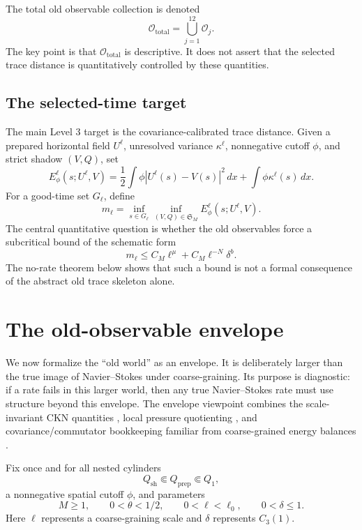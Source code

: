 \documentclass[11pt]{article}
\numberwithin{equation}{section}
\newcommand{\dx}{\,dx}
\newcommand{\calO}{\mathcal O}
\newcommand{\frakS}{\mathfrak S}
\begin{document}
The total old observable collection is denoted
\[
\calO_{\mathrm{total}}=\bigcup_{j=1}^{12}\calO_j.
\]
The key point is that \(\calO_{\mathrm{total}}\) is descriptive.  It does not assert that the selected trace distance is quantitatively controlled by these quantities.

\subsection{The selected-time target}

The main Level 3 target is the covariance-calibrated trace distance.  Given a prepared horizontal field \(U^\ell\), unresolved variance \(\kappa^\ell\), nonnegative cutoff \(\phi\), and strict shadow \((V,Q)\), set
\begin{equation}\label{eq:selected-trace-energy}
E^\ell_\phi(s;U^\ell,V)
=
\frac12\int \phi |U^\ell(s)-V(s)|^2\dx
+
\int \phi\kappa^\ell(s)\dx.
\end{equation}
For a good-time set \(G_\ell\), define
\begin{equation}\label{eq:m-ell}
m_\ell=
\inf_{s\in G_\ell}\inf_{(V,Q)\in\frakS_M}
E^\ell_\phi(s;U^\ell,V).
\end{equation}
The central quantitative question is whether the old observables force a subcritical bound of the schematic form
\begin{equation}\label{eq:subcritical-selection-target}
m_\ell
\le
C_M\ell^\mu+C_M\ell^{-N}\delta^b.
\end{equation}
The no-rate theorem below shows that such a bound is not a formal consequence of the abstract old trace skeleton alone.

\section{The old-observable envelope}\label{sec:old-envelope}

We now formalize the ``old world'' as an envelope.  It is deliberately larger than the true image of Navier--Stokes under coarse-graining.  Its purpose is diagnostic: if a rate fails in this larger world, then any true Navier--Stokes rate must use structure beyond this envelope.  The envelope viewpoint combines the scale-invariant CKN quantities \cite{CKN1982}, local pressure quotienting \cite{SohrWahl1986,Wolf2017,Yu2026HarmonicPressure}, and covariance/commutator bookkeeping familiar from coarse-grained energy balances \cite{ConstantinETiti1994}.

Fix once and for all nested cylinders
\[
Q_{\mathrm{sh}}\Subset Q_{\mathrm{prep}}\Subset Q_1,
\]
a nonnegative spatial cutoff \(\phi\), and parameters
\[
M\ge1,
\qquad 0<\theta<1/2,
\qquad 0<\ell<\ell_0,
\qquad 0<\delta\le1.
\]
Here \(\ell\) represents a coarse-graining scale and \(\delta\) represents \(C_3(1)\).
\end{document}
